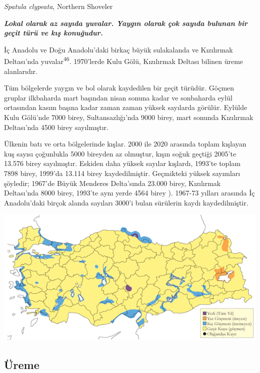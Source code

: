 \documentclass[
  letterpaper,
  DIV=11,
  numbers=noendperiod]{scrreprt}
\begin{document}
\emph{Spatula clypeata}, Northern Shoveler

\textbf{\emph{Lokal olarak az sayıda yuvalar. Yaygın olarak çok sayıda
bulunan bir geçit türü ve kış konuğudur.}}

İç Anadolu ve Doğu Anadolu'daki birkaç büyük sulakalanda ve Kızılırmak
Deltası'nda yuvalar\textsuperscript{46}. 1970'lerde Kulu Gölü,
Kızılırmak Deltası bilinen üreme alanlarıdır.

Tüm bölgelerde yaygın ve bol olarak kaydedilen bir geçit türüdür. Göçmen
gruplar ilkbaharda mart başından nisan sonuna kadar ve sonbaharda eylül
ortasından kasım başına kadar zaman zaman yüksek sayılarda görülür.
Eylülde Kulu Gölü'nde 7000 birey, Sultansazlığı'nda 9000 birey, mart
sonunda Kızılırmak Deltası'nda 4500 birey sayılmıştır.

Ülkenin batı ve orta bölgelerinde kışlar. 2000 ile 2020 arasında toplam
kışlayan kuş sayısı çoğunlukla 5000 bireyden az olmuştur, kışın soğuk
geçtiği 2005'te 13.576 birey sayılmıştır. Eskiden daha yüksek sayılar
kışlardı, 1993'te toplam 7898 birey, 1999'da 13.114 birey
kaydedilmiştir. Geçmikteki yüksek sayımları şöyledir; 1967'de Büyük
Menderes Delta'sında 23.000 birey, Kızılırmak Deltası'nda 8000 birey,
1993'te aynı yerde 4564 birey ). 1967-73 yılları arasında İç
Anadolu'daki birçok alanda sayıları 3000'i bulan sürülerin kaydı
kaydedilmiştir.

\includegraphics{images/harita_Page_017.png}

\hypertarget{uxfcreme-16}{%
\subsection{\texorpdfstring{\textbf{Üreme}}{Üreme}}\label{uxfcreme-16}}
\end{document}
